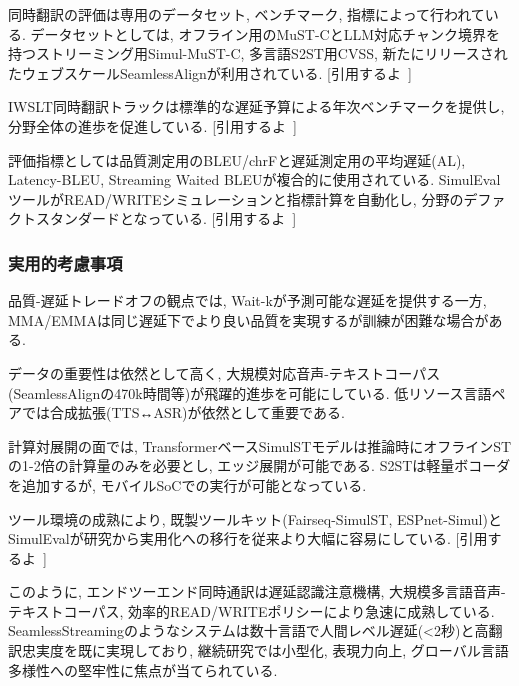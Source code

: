 同時翻訳の評価は専用のデータセット, ベンチマーク, 指標によって行われている.
データセットとしては, オフライン用のMuST-CとLLM対応チャンク境界を持つストリーミング用Simul-MuST-C, 多言語S2ST用CVSS, 新たにリリースされたウェブスケールSeamlessAlignが利用されている.
[引用するよ~]

IWSLT同時翻訳トラックは標準的な遅延予算による年次ベンチマークを提供し, 分野全体の進歩を促進している.
[引用するよ~]

評価指標としては品質測定用のBLEU/chrFと遅延測定用の平均遅延(AL), Latency-BLEU, Streaming Waited BLEUが複合的に使用されている.
SimulEvalツールがREAD/WRITEシミュレーションと指標計算を自動化し, 分野のデファクトスタンダードとなっている.
[引用するよ~]

\subsubsection{実用的考慮事項}

品質-遅延トレードオフの観点では, Wait-kが予測可能な遅延を提供する一方, MMA/EMMAは同じ遅延下でより良い品質を実現するが訓練が困難な場合がある.

データの重要性は依然として高く, 大規模対応音声-テキストコーパス(SeamlessAlignの470k時間等)が飛躍的進歩を可能にしている.
低リソース言語ペアでは合成拡張(TTS↔ASR)が依然として重要である.

計算対展開の面では, TransformerベースSimulSTモデルは推論時にオフラインSTの1-2倍の計算量のみを必要とし, エッジ展開が可能である.
S2STは軽量ボコーダを追加するが, モバイルSoCでの実行が可能となっている.

ツール環境の成熟により, 既製ツールキット(Fairseq-SimulST, ESPnet-Simul)とSimulEvalが研究から実用化への移行を従来より大幅に容易にしている.
[引用するよ~]

このように, エンドツーエンド同時通訳は遅延認識注意機構, 大規模多言語音声-テキストコーパス, 効率的READ/WRITEポリシーにより急速に成熟している.
SeamlessStreamingのようなシステムは数十言語で人間レベル遅延(<2秒)と高翻訳忠実度を既に実現しており, 継続研究では小型化, 表現力向上, グローバル言語多様性への堅牢性に焦点が当てられている.